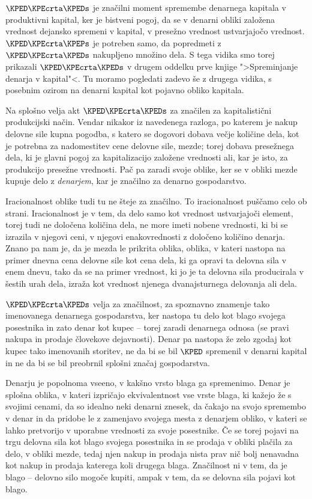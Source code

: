 \documentclass[kapital_02.tex]{subfiles}
\begin{document}
\(\KPED\KPEcrta\KPEDs\) je značilni moment spremembe denarnega kapitala v produktivni kapital, ker je bistveni pogoj, da se v denarni obliki založena vrednost dejansko spremeni v kapital, v presežno vrednost ustvarjajočo vrednost. \(\KPED\KPEcrta\KPEPs\) je potreben samo, da popredmeti z \(\KPED\KPEcrta\KPEDs\) nakupljeno množino dela. S tega vidika smo torej prikazali \(\KPED\KPEcrta\KPEDs\) v drugem oddelku prve knjige ">Spreminjanje denarja v kapital"<. Tu moramo pogledati zadevo še z drugega vidika, s posebnim ozirom na denarni kapital kot pojavno obliko kapitala.

Na splošno velja akt \(\KPED\KPEcrta\KPEDs\) za značilen za kapitalistični produkcijski način. Vendar nikakor iz navedenega razloga, po katerem je nakup delovne sile kupna pogodba, s katero se dogovori dobava večje količine dela, kot je potrebna za nadomestitev cene delovne sile, mezde; torej dobava presežnega dela, ki je glavni pogoj za kapitalizacijo založene vrednosti ali, kar je isto, za produkcijo presežne vrednosti. Pač pa zaradi svoje oblike, ker se v obliki mezde kupuje delo z \emph{denarjem}, kar je značilno za denarno gospodarstvo.

Iracionalnost oblike tudi tu ne šteje za značilno. To iracionalnost puščamo celo ob strani. Iracionalnost je v tem, da delo samo kot vrednost ustvarjajoči element, torej tudi ne določena količina dela, ne more imeti nobene vrednosti, ki bi se izrazila v njegovi ceni, v njegovi enakovrednosti z določeno količino denarja. Znano pa nam je, da je mezda le \KPEstran prikrita oblika, oblika, v kateri nastopa na primer dnevna cena delovne sile kot cena dela, ki ga opravi ta delovna sila v enem dnevu, tako da se na primer vrednost, ki jo je ta delovna sila producirala v šestih urah dela, izraža kot vrednost njenega dvanajsturnega delovanja ali dela.

\(\KPED\KPEcrta\KPEDs\) velja za značilnost, za spoznavno znamenje tako imenovanega denarnega gospodarstva, ker nastopa tu delo kot blago svojega posestnika in zato denar kot kupec -- torej zaradi denarnega odnosa (se pravi nakupa in prodaje človekove dejavnosti). Denar pa nastopa že zelo zgodaj kot kupec tako imenovanih storitev, ne da bi se bil \(\KPED\) spremenil v denarni kapital in ne da bi se bil preobrnil splošni značaj gospodarstva.

Denarju je popolnoma vseeno, v kakšno vrsto blaga ga spremenimo. Denar je splošna oblika, v kateri izpričajo ekvivalentnost vse vrste blaga, ki kažejo že s svojimi cenami, da so idealno neki denarni znesek, da čakajo na svojo spremembo v denar in da pridobe le z zamenjavo svojega mesta z denarjem obliko, v kateri se lahko pretvorijo v uporabne vrednosti za svoje posestnike. Če se torej pojavi na trgu delovna sila kot blago svojega posestnika in se prodaja v obliki plačila za delo, v obliki mezde, tedaj njen nakup in prodaja nista prav nič bolj nenavadna kot nakup in prodaja katerega koli drugega blaga. Značilnost ni v tem, da je blago -- delovno silo mogoče kupiti, ampak v tem, da se delovna sila pojavi kot blago.
\end{document}
